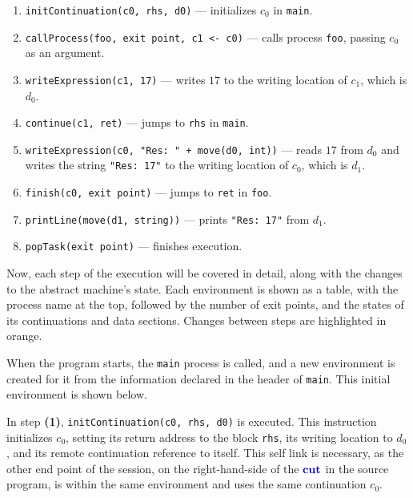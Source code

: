 \documentclass[sigconf,nonacm,natbib=true]{acmart}
\begin{document}
\begin{enumerate}[leftmargin=*]
  \item \texttt{initContinuation(c0, rhs, d0)} --- initializes $c_0$ in \texttt{main}.
  \item \texttt{callProcess(foo, exit point, c1 <- c0)} --- calls process \texttt{foo}, passing $c_0$ as an argument.
  \item \texttt{writeExpression(c1, 17)} --- writes $17$ to the writing location of $c_1$, which is $d_0$.
  \item \texttt{continue(c1, ret)} --- jumps to \texttt{rhs} in \texttt{main}.
  \item \texttt{writeExpression(c0, "Res:\ " + move(d0, int))} --- reads $17$ from $d_0$ and writes the string \texttt{"Res:\ 17"} to the writing location of $c_0$, which is $d_1$.
  \item \texttt{finish(c0, exit point)} --- jumps to \texttt{ret} in \texttt{foo}.
  \item \texttt{printLine(move(d1, string))} --- prints \texttt{"Res:\ 17"} from $d_1$.
  \item \texttt{popTask(exit point)} --- finishes execution.
\end{enumerate}

Now, each step of the execution will be covered in detail, along with the changes to the abstract machine's state. Each environment is shown as a table, with the process name at the top, followed by the number of exit points, and the states of its continuations and data sections. Changes between steps are highlighted in orange.

When the program starts, the \texttt{main} process is called, and a new environment is created for it from the information declared in the header of \texttt{main}. This initial environment is shown below.

\begin{center}
\end{center}

In step \textbf{(1)}, \texttt{initContinuation(c0, rhs, d0)} is executed. This instruction initializes $c_0$, setting its return address to the block \texttt{rhs}, its writing location to $d_0$, and its remote continuation reference to itself. This self link is necessary, as the other end point of the session, on the right-hand-side of the $\cutp$ in the source program, is within the same environment and uses the same continuation $c_0$.
\end{document}
